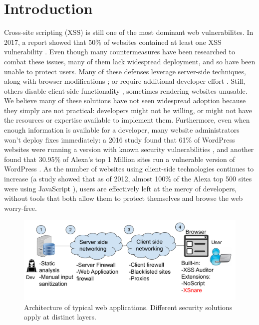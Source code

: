 \section{Introduction}

Cross-site scripting (XSS) is still one of the most dominant web vulnerabilites. In 2017, a report showed that 50\% of websites contained at least one XSS vulnerability \cite{Acunetix}. Even though many countermeasures have been researched to combat these issues, many of them lack widespread deployment, and so have been unable to protect users. Many of these defenses leverage server-side techniques, along with browser modifications \cite{Jim:2007:DSI:1242572.1242654,Nadji:2009,Wurzinger:2009:SMX:1656360.1656379,10.1007/978-3-642-31540-4_17}; or require additional developer effort \cite{10.1007/978-3-319-66399-9_7}. Still, others disable client-side functionality \cite{Noscript,Snyder:2017:MWD:3133956.3133966}, sometimes rendering websites unusable. We believe many of these solutions have not seen widespread adoption because they simply are not practical: developers might not be willing, or might not have the resources or expertise available to implement them. Furthermore, even when enough information is available for a developer, many website administrators won't deploy fixes immediately: a 2016 study found that 61\% of WordPress websites were running a version with known security vulnerabilities \cite{Sucuri}, and another found that 30.95\% of Alexa's top 1 Million sites run a vulnerable version of WordPress \cite{wpwhitesecurity}. As the number of websites using client-side technologies continues to increase (a study showed that as of 2012, almost 100\% of the Alexa top 500 sites were using JavaScript \cite{Stock:2017:WTI:3241189.3241265}), users are effectively left at the mercy of developers, without tools that both allow them to protect themselves and browse the web worry-free.

 
 \begin{figure}[h]
 	\includegraphics[scale=0.37]{img/web_app_architecture_one.pdf}
 	\caption{Architecture of typical web applications. Different security solutions apply at distinct layers.}
 	\label{fig:web_architecture}
 \end{figure}
 
